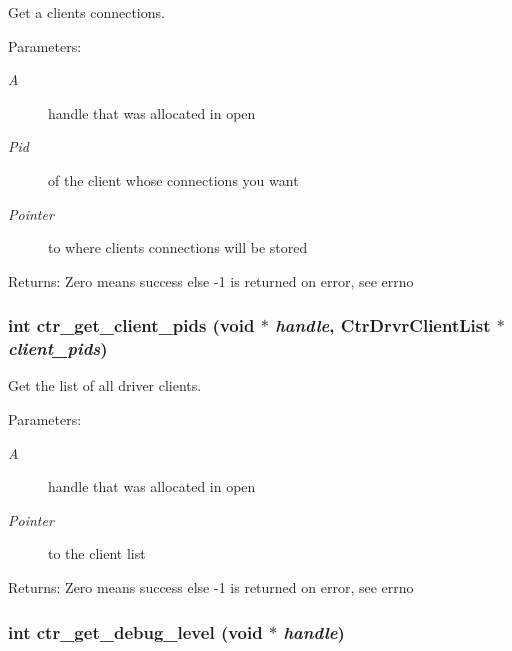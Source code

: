 Get a clients connections. 

\begin{Desc}
\item[Parameters:]
\begin{description}
\item[{\em A}]handle that was allocated in open \item[{\em Pid}]of the client whose connections you want \item[{\em Pointer}]to where clients connections will be stored \end{description}
\end{Desc}
\begin{Desc}
\item[Returns:]Zero means success else -1 is returned on error, see errno \end{Desc}
\subsubsection{\setlength{\rightskip}{0pt plus 5cm}int ctr\_\-get\_\-client\_\-pids (void $\ast$ {\em handle}, Ctr\-Drvr\-Client\-List $\ast$ {\em client\_\-pids})}\label{libctr_8doxygen_fb395f219db7cb041519c4c206dd0055}


Get the list of all driver clients. 

\begin{Desc}
\item[Parameters:]
\begin{description}
\item[{\em A}]handle that was allocated in open \item[{\em Pointer}]to the client list \end{description}
\end{Desc}
\begin{Desc}
\item[Returns:]Zero means success else -1 is returned on error, see errno \end{Desc}
\subsubsection{\setlength{\rightskip}{0pt plus 5cm}int ctr\_\-get\_\-debug\_\-level (void $\ast$ {\em handle})}\label{libctr_8doxygen_bbc79d7b8a2cea5d03d94854245a69ef}


